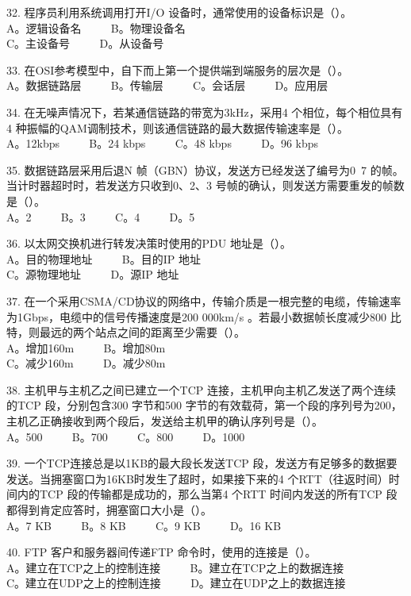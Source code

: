 32. 程序员利用系统调用打开I/O 设备时，通常使用的设备标识是（）。 \\
A。逻辑设备名 $\qquad$ B。物理设备名 \\
C。主设备号 $\qquad$ D。从设备号

33. 在OSI参考模型中，自下而上第一个提供端到端服务的层次是（）。 \\
A。数据链路层 $\qquad$ B。传输层 $\qquad$ C。会话层 $\qquad$ D。应用层

34. 在无噪声情况下，若某通信链路的带宽为3kHz，采用4 个相位，每个相位具有4 种振幅的QAM调制技术，则该通信链路的最大数据传输速率是（）。 \\
A。12kbps $\qquad$ B。24 kbps $\qquad$ C。48 kbps $\qquad$ D。96 kbps

35. 数据链路层采用后退N 帧（GBN）协议，发送方已经发送了编号为0~7 的帧。当计时器超时时，若发送方只收到0、2、3 号帧的确认，则发送方需要重发的帧数是（）。 \\
A。2 $\qquad$ B。3 $\qquad$ C。4 $\qquad$ D。5

36. 以太网交换机进行转发决策时使用的PDU 地址是（）。 \\
A。目的物理地址 $\qquad$ B。目的IP 地址 \\
C。源物理地址 $\qquad$ D。源IP 地址

37. 在一个采用CSMA/CD协议的网络中，传输介质是一根完整的电缆，传输速率为1Gbps，电缆中的信号传播速度是200 000km/s 。若最小数据帧长度减少800 比特，则最远的两个站点之间的距离至少需要（）。 \\
A。增加160m $\qquad$ B。增加80m \\
C。减少160m $\qquad$ D。减少80m

38. 主机甲与主机乙之间已建立一个TCP 连接，主机甲向主机乙发送了两个连续的TCP 段，分别包含300 字节和500 字节的有效载荷，第一个段的序列号为200，主机乙正确接收到两个段后，发送给主机甲的确认序列号是（）。 \\
A。500 $\qquad$ B。700 $\qquad$ C。800 $\qquad$ D。1000

39. 一个TCP连接总是以1KB的最大段长发送TCP 段，发送方有足够多的数据要发送。当拥塞窗口为16KB时发生了超时，如果接下来的4 个RTT（往返时间）时间内的TCP 段的传输都是成功的，那么当第4 个RTT 时间内发送的所有TCP 段都得到肯定应答时，拥塞窗口大小是（）。 \\
A。7 KB $\qquad$ B。8 KB $\qquad$ C。9 KB $\qquad$ D。16 KB

40. FTP 客户和服务器间传递FTP 命令时，使用的连接是（）。 \\
A。建立在TCP之上的控制连接 $\qquad$ B。建立在TCP之上的数据连接 \\
C。建立在UDP之上的控制连接 $\qquad$ D。建立在UDP之上的数据连接

